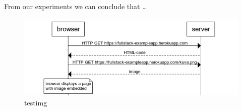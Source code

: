 \documentclass[a4paper, 11pt]{article}
\begin{document}
From our experiments we can conclude that \ldots

\begin{figure}[tphb]
    \centering
    \includegraphics[width=7in]{img/testimg.png}
    \caption{testimg}
    \label{img:testimg}
\end{figure}

\pagebreak


\end{document}
